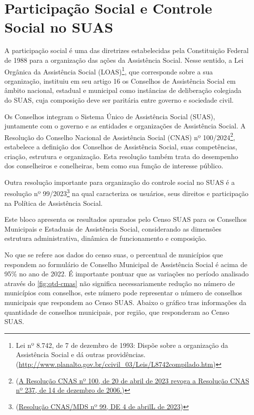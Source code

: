 \documentclass[
  brazilian]{report}
\begin{document}
\hypertarget{participauxe7uxe3o-social-e-controle-social-no-suas}{%
\chapter{Participação Social e Controle Social no
SUAS}\label{participauxe7uxe3o-social-e-controle-social-no-suas}}

A participação social é uma das diretrizes estabelecidas pela
Constituição Federal de 1988 para a organização das ações da Assistência
Social. Nesse sentido, a Lei Orgânica da Assistência Social
(LOAS)\footnote{Lei nº 8.742, de 7 de dezembro de 1993: Dispõe sobre a organização da Assistência Social e dá outras providências. (\url{http://www.planalto.gov.br/ccivil_03/Leis/L8742compilado.htm})},
que corresponde sobre a sua organização, instituiu em seu artigo 16 os
Conselhos de Assistência Social em âmbito nacional, estadual e municipal
como instâncias de deliberação colegiada do SUAS, cuja composição deve
ser paritária entre governo e sociedade civil.

Os Conselhos integram o Sistema Único de Assistência Social (SUAS),
juntamente com o governo e as entidades e organizações de Assistência
Social. A Resolução do Conselho Nacional de Assistência Social (CNAS) nº
100/2024\footnote{(\url{A Resolução CNAS nº 100, de 20 de abril de 2023 revoga a Resolução CNAS nº 237, de 14 de dezembro de 2006.})},
estabelece a definição dos Conselhos de Assistência Social, suas
competências, criação, estrutura e organização. Esta resolução também
trata do desempenho dos conselheiros e conelheiras, bem como sua função
de interesse público.

Outra resolução importante para organização do controle social no SUAS é
a resolução nº
99/2023\footnote{(\url{Resolução CNAS/MDS nº 99, DE 4 de abrilL de 2023})}
na qual caracteriza os usuários, seus direitos e participação na
Política de Assistência Social.

Este bloco apresenta os resultados apurados pelo Censo SUAS para os
Conselhos Municipais e Estaduais de Assistência Social, considerando as
dimensões estrutura administrativa, dinâmica de funcionamento e
composição.

No que se refere aos dados do censo suas, o percentual de municípios que
respondem ao formulário de Conselho Municipal de Assistência Social é
acima de 95\% no ano de 2022. É importante pontuar que as variações no
período analisado através do \cref{fig:qtd-cmas} não significa
necessariamente redução no número de municípios com conselhos, este
número pode representar o número de conselhos municipais que respondem
ao Censo SUAS. Abaixo o gráfico tras informações da quantidade de
conselhos municipais, por região, que responderam ao Censo SUAS.
\end{document}
